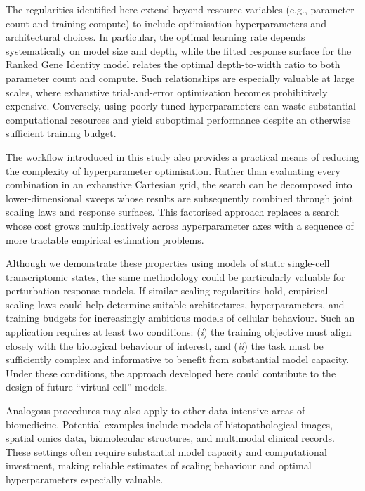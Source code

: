 \documentclass[pdflatex,sn-nature]{sn-jnl}%
\theoremstyle{thmstyleone}%
\theoremstyle{thmstyletwo}%
\theoremstyle{thmstylethree}%
\begin{document}
The regularities identified here extend beyond resource variables (e.g., parameter count and training compute) to include optimisation hyperparameters and architectural choices. 
In particular, the optimal learning rate depends systematically on model size and depth, while the fitted response surface for the Ranked Gene Identity model relates the optimal depth-to-width ratio to both parameter count and compute. 
Such relationships are especially valuable at large scales, where exhaustive trial-and-error optimisation becomes prohibitively expensive. 
Conversely, using poorly tuned hyperparameters can waste substantial computational resources and yield suboptimal performance despite an otherwise sufficient training budget.

The workflow introduced in this study also provides a practical means of reducing the complexity of hyperparameter optimisation. 
Rather than evaluating every combination in an exhaustive Cartesian grid, the search can be decomposed into lower-dimensional sweeps whose results are subsequently combined through joint scaling laws and response surfaces. 
This factorised approach replaces a search whose cost grows multiplicatively across hyperparameter axes with a sequence of more tractable empirical estimation problems.

Although we demonstrate these properties using models of static single-cell transcriptomic states, the same methodology could be particularly valuable for perturbation-response models. 
If similar scaling regularities hold, empirical scaling laws could help determine suitable architectures, hyperparameters, and training budgets for increasingly ambitious models of cellular behaviour. 
Such an application requires at least two conditions: (\textit{i}) the training objective must align closely with the biological behaviour of interest, and (\textit{ii}) the task must be sufficiently complex and informative to benefit from substantial model capacity. 
Under these conditions, the approach developed here could contribute to the design of future ``virtual cell'' models.

Analogous procedures may also apply to other data-intensive areas of biomedicine. 
Potential examples include models of histopathological images, spatial omics data, biomolecular structures, and multimodal clinical records. 
These settings often require substantial model capacity and computational investment, making reliable estimates of scaling behaviour and optimal hyperparameters especially valuable.
\end{document}
